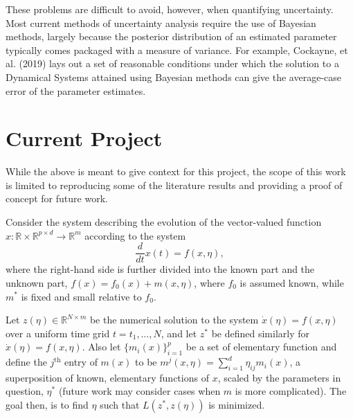 \documentclass[12pt]{article}
\begin{document}
These problems are difficult to avoid, however, when quantifying uncertainty. Most current methods of uncertainty analysis require the use of Bayesian methods, largely because the posterior distribution of an estimated parameter typically comes packaged with a measure of variance. For example, Cockayne, et al. (2019) lays out a set of reasonable conditions under which the solution to a Dynamical Systems attained using Bayesian methods can give the average-case error of the parameter estimates.\cite{cockayne}


\section{Current Project}



While the above is meant to give context for this project, the scope of this work is limited to reproducing some of the literature results and providing a proof of concept for future work.

Consider the system describing the evolution of the vector-valued function $x: \mathbb{R} \times \mathbb{R}^{p \times d} \to \mathbb{R}^m$ according to the system $$\frac{d}{d t}x(t) = f(x,\eta),$$ where the right-hand side is further divided into the known part and the unknown part, $f(x) = f_0(x) + m(x, \eta)$, where $f_0$ is assumed known, while $m^*$ is fixed and small relative to $f_0$.

Let $z(\eta) \in \mathbb{R}^{N \times m}$ be the numerical solution to the system $\dot{x}(\eta) = f(x,\eta)$ over a uniform time grid $t=t_1,\ldots, N$, and let $z^*$ be defined similarly for $\dot{x}(\eta) = f(x,\eta)$. Also let $\{m_i(x)\}_{i=1}^p$ be a set of elementary function and define the $j^{\text{th}}$ entry of $m(x)$ to be $m^j(x, \eta) = \sum_{i=1}^d \eta_{ij} m_i(x)$, a superposition of known, elementary functions of $x$, scaled by the parameters in question, $\eta^*$ (future work may consider cases when $m$ is more complicated). The goal then, is to find $\eta$ such that $L(z^*, z(\eta))$ is minimized.
\end{document}
